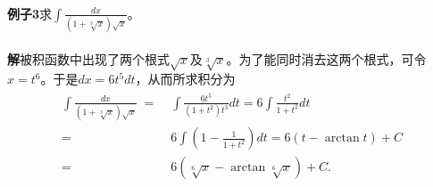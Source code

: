 \paragraph{}
\textbf{例子3\;}求$\displaystyle\int \frac{dx}{(1+\sqrt[3]{x})\sqrt{x}}$。

\paragraph{}
\textbf{解\;}被积函数中出现了两个根式$\sqrt{x}$及$\sqrt[3]{x}$。为了能同时消去这两个根式，可令$x=t^6$。于是$dx=6t^5dt$，从而所求积分为
\begin{align*}
\begin{split}
  \int\frac{dx}{(1+\sqrt[3]{x})\sqrt{x}} \;=&\; \int\frac{6t^5}{(1+t^2)t^3}dt
  = 6\int\frac{t^2}{1+t^2}dt \\
  =&\; 6\int(1-\frac{1}{1+t^2})dt = 6(t-\arctan{t}) + C \\
  =&\; 6(\sqrt[6]{x} - \arctan\sqrt[6]{x}) + C.
\end{split}
\end{align*}
